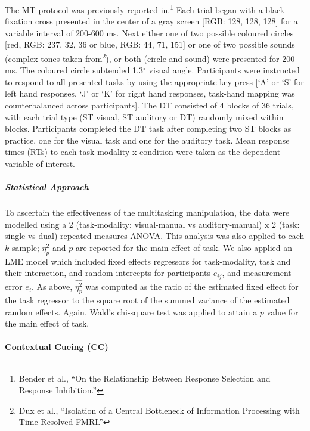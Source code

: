 \documentclass[
  12pt,
]{article}
\begin{document}
The MT protocol was previously reported in.\footnote{Bender et al., ``On the Relationship Between Response Selection and Response Inhibition.''} Each trial began with a black fixation cross presented in the center of a gray screen {[}RGB: 128, 128, 128{]} for a variable interval of 200-600 ms. Next either one of two possible coloured circles {[}red, RGB: 237, 32, 36 or blue, RGB: 44, 71, 151{]} or one of two possible sounds (complex tones taken from\footnote{Dux et al., ``Isolation of a Central Bottleneck of Information Processing with Time-Resolved FMRI.''}), or both (circle and sound) were presented for 200 ms. The coloured circle subtended 1.3\(^\circ\) visual angle. Participants were instructed to respond to all presented tasks by using the appropriate key press {[}`A' or `S' for left hand responses, `J' or `K' for right hand responses, task-hand mapping was counterbalanced across participants{]}. The DT consisted of 4 blocks of 36 trials, with each trial type (ST visual, ST auditory or DT) randomly mixed within blocks. Participants completed the DT task after completing two ST blocks as practice, one for the visual task and one for the auditory task. Mean response times (RTs) to each task modality x condition were taken as the dependent variable of interest.

\hypertarget{statistical-approach}{%
\subparagraph{Statistical Approach}\label{statistical-approach}}

To ascertain the effectiveness of the multitasking manipulation, the data were modelled using a 2 (task-modality: visual-manual vs auditory-manual) x 2 (task: single vs dual) repeated-measures ANOVA. This analysis was also applied to each \(k\) sample; \(\eta_{p}^{2}\) and \(p\) are reported for the main effect of task. We also applied an LME model which included fixed effects regressors for task-modality, task and their interaction, and random intercepts for participants \(e_{ij}\), and measurement error \(e_{i}\). As above, \(\hat{\eta_{p}^{2}}\) was computed as the ratio of the estimated fixed effect for the task regressor to the square root of the summed variance of the estimated random effects. Again, Wald's chi-square test was applied to attain a \(p\) value for the main effect of task.

\hypertarget{contextual-cueing-cc}{%
\paragraph{Contextual Cueing (CC)}\label{contextual-cueing-cc}}
\end{document}
